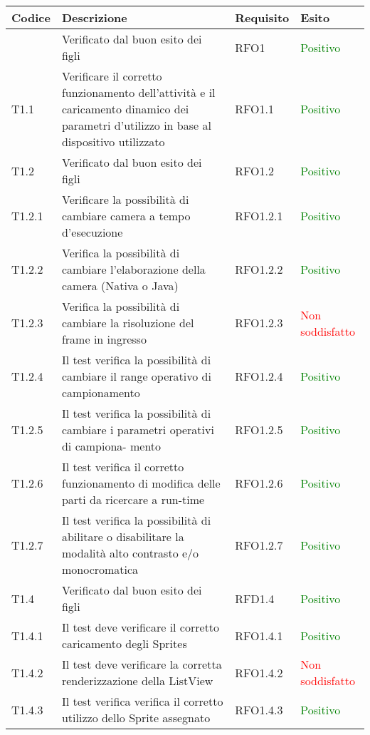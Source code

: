 \begin{center}
    \begin{longtable}{ | p{2cm} | p{6cm} | p{2cm} | p{2cm} |}
    \hline
    Codice & Descrizione & Requisito & Esito \\ \hline
        & Verificato dal buon esito dei figli &RFO1 & \textcolor{green}{Positivo}\\ \hline 
    T1.1& Verificare il corretto funzionamento dell'attività e il caricamento dinamico dei parametri d'utilizzo in base al dispositivo utilizzato &RFO1.1 & \textcolor{green}{Positivo}\\ \hline 
    T1.2& Verificato dal buon esito dei figli  &RFO1.2 & \textcolor{green}{Positivo}\\ \hline 
    T1.2.1& Verificare la possibilità di cambiare camera a tempo d'esecuzione &RFO1.2.1 & \textcolor{green}{Positivo}\\ \hline 
    T1.2.2& Verifica la possibilità di cambiare l'elaborazione della camera (Nativa o Java) &RFO1.2.2 & \textcolor{green}{Positivo}\\ \hline 
   T1.2.3 &Verifica la possibilità di cambiare la risoluzione del frame in ingresso&RFO1.2.3 & \textcolor{red}{Non soddisfatto}\\ \hline 
    T1.2.4& Il test verifica la possibilità di cambiare il range operativo di campionamento &RFO1.2.4 & \textcolor{green}{Positivo}\\ \hline 
    T1.2.5&Il test verifica la possibilità di cambiare i parametri operativi di campiona-
mento &RFO1.2.5 & \textcolor{green}{Positivo}\\ \hline 
    T1.2.6&Il test verifica il corretto funzionamento di modifica delle parti da ricercare a
run-time &RFO1.2.6 & \textcolor{green}{Positivo}\\ \hline 
    T1.2.7&Il test verifica la possibilità di abilitare o disabilitare la modalità alto contrasto
e/o monocromatica &RFO1.2.7 & \textcolor{green}{Positivo}\\ \hline 
    T1.4& Verificato dal buon esito dei figli &RFD1.4 & \textcolor{green}{Positivo}\\ \hline 
    T1.4.1&Il test deve verificare il corretto caricamento degli Sprites &RFO1.4.1 & \textcolor{green}{Positivo}\\ \hline 
    T1.4.2&Il test deve verificare la corretta renderizzazione della ListView &RFO1.4.2 & \textcolor{red}{Non soddisfatto}\\ \hline 
    T1.4.3&Il test verifica verifica il corretto utilizzo dello Sprite assegnato &RFO1.4.3& \textcolor{green}{Positivo}\\ \hline 

\end{longtable}
\end{center}
